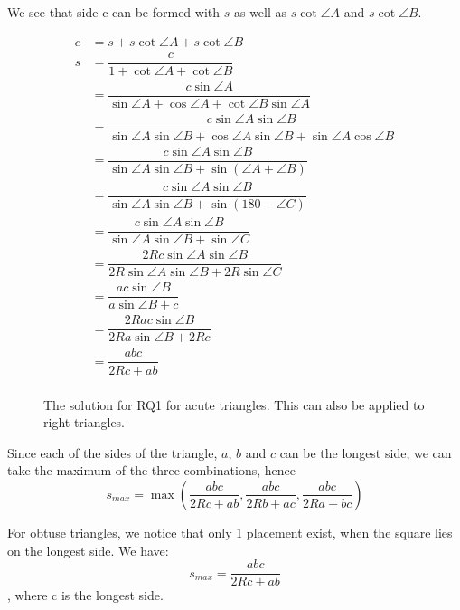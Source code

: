 \documentclass[12pt]{scrartcl}
\begin{document}
We see that side c can be formed with \(s\) as well as \(s \cot \angle A\) and \(s \cot \angle B\).
\begin{figure}[htpb]
	\centering
	\begin{align*}
		c              & = s+s\cot \angle A+s\cot \angle B                                                                           \\
		s              & = \dfrac{c}{1+\cot \angle A+\cot \angle B}                                                                             \\
		               & = \dfrac{c \sin\angle A}{\sin\angle A+\cos\angle A+\cot\angle B\sin\angle A}                                        \\
		               & = \dfrac{c\sin\angle A\sin\angle B}{\sin\angle A\sin\angle B+\cos\angle A\sin\angle B+\sin\angle A\cos\angle B} \\
		               & = \dfrac{c\sin\angle A\sin\angle B}{\sin\angle A\sin\angle B+\sin\left(\angle A+\angle B\right)}                    \\
		               & = \dfrac{c\sin\angle A\sin\angle B}{\sin\angle A\sin\angle B+\sin\left(180-\angle C\right)}                         \\
		               & = \dfrac{c\sin\angle A\sin\angle B}{\sin\angle A\sin\angle B+\sin \angle C}                                         \\
		               & = \dfrac{2Rc\sin\angle A\sin\angle B}{2R\sin\angle A\sin \angle B+2R\sin \angle C}                                   \\
		               & = \dfrac{ac\sin\angle B}{a\sin\angle B+c}                                                                             \\
		               & = \dfrac{2Rac\sin\angle B}{2Ra\sin\angle B+2Rc}                                                                       \\
		               & = \dfrac{abc}{2Rc+ab}                                                                                                   \\
	\end{align*}
	\caption{The solution for RQ1 for acute triangles. This can also be applied to right triangles.}
	\label{fig:rq1m}
\end{figure}

Since each of the sides of the triangle, $a$, $b$ and $c$ can be the longest side, 
we can take the maximum of the three combinations, hence
\begin{equation}
s_{max} = \max\left(\dfrac{abc}{2Rc+ab},\dfrac{abc}{2Rb+ac},\dfrac{abc}{2Ra+bc}\right)
\end{equation}

For obtuse triangles, we notice that only 1 placement exist, when the square lies on the longest side. We have: 
\begin{equation}
s_{max} = \dfrac{abc}{2Rc+ab}
\end{equation}
, where c is the longest side.

\printbibliography
\end{document}
